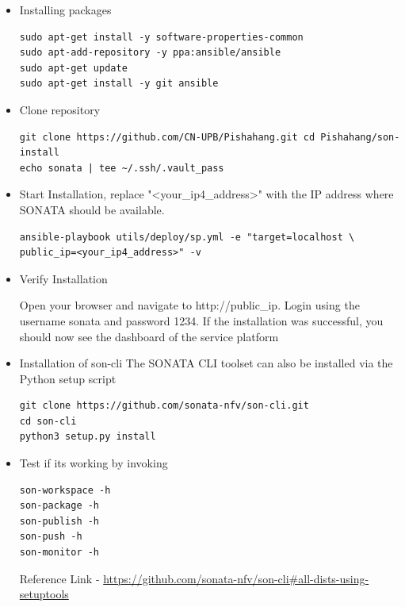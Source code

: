 	\begin{itemize}
		\item Installing packages
		\begin{lstlisting}
sudo apt-get install -y software-properties-common
sudo apt-add-repository -y ppa:ansible/ansible
sudo apt-get update
sudo apt-get install -y git ansible
		\end{lstlisting}
		\item Clone repository
		\begin{lstlisting}
git clone https://github.com/CN-UPB/Pishahang.git cd Pishahang/son-install
echo sonata | tee ~/.ssh/.vault_pass
		\end{lstlisting}
		\item Start Installation,
		replace "<your\_ip4\_address>" with the IP address where SONATA should be available.
		\begin{lstlisting}
ansible-playbook utils/deploy/sp.yml -e "target=localhost \ public_ip=<your_ip4_address>" -v 
		\end{lstlisting} 
		\item Verify Installation

Open your browser and navigate to http://public\_ip. Login using the username 
sonata and password 1234. If the installation was successful, you should now see 
the dashboard of the service platform

		\item Installation of son-cli
		The SONATA CLI toolset can also be installed via the Python setup script
		\begin{lstlisting}
git clone https://github.com/sonata-nfv/son-cli.git
cd son-cli
python3 setup.py install
		\end{lstlisting}
		
		\item Test if its working by invoking
		\begin{lstlisting}
son-workspace -h
son-package -h
son-publish -h
son-push -h
son-monitor -h
		\end{lstlisting}
		Reference Link - \hyperlink{name}{https://github.com/sonata-nfv/son-cli\#all-dists-using-setuptools}
	\end{itemize}
	
	
	
